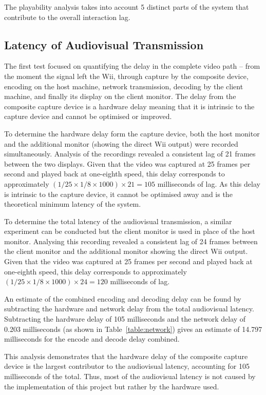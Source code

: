 The playability analysis takes into account 5 distinct parts of the system that
contribute to the overall interaction lag\cite{volkerseekerBestPaper}.

\subsection{Latency of Audiovisual Transmission}
\label{subsec:latency-audiovisual}

The first test focused on quantifying the delay in the complete video path -- from
the moment the signal left the Wii, through capture by the composite device,
encoding on the host machine, network transmission, decoding by the client
machine, and finally its display on the client monitor. The delay from the composite
capture device is a hardware delay meaning that it is intrinsic to the
capture device and cannot be optimised or improved.

To determine the hardware delay form the capture device,
both the host monitor and the additional monitor (showing the direct Wii
output) were recorded simultaneously. Analysis of the recordings revealed a
consistent lag of 21 frames between the two displays. Given that the video was
captured at 25 frames per second and played back at one-eighth speed, this delay
corresponds to approximately $(1/25 \times 1/8 \times 1000) \times 21 = 105$ milliseconds of lag. As this delay is intrinsic to the capture device, it cannot be optimised away and is the theoretical minimum latency of the system.

To determine the total latency of the audiovisual transmission, a similar experiment can be conducted but the client monitor is used in place of the host monitor. Analysing this recording revealed a consistent lag of 24 frames between the client monitor and the additional monitor showing the direct Wii output. Given that the video was captured at 25 frames per second and played back at one-eighth speed, this delay corresponds to approximately $(1/25 \times 1/8 \times 1000) \times 24 = 120$ milliseconds of lag.

An estimate of the combined encoding and decoding delay can be found by subtracting the hardware and network delay from the total audiovisual latency. Subtracting the hardware delay of 105 milliseconds and the network delay of 0.203 milliseconds (as shown in Table~\ref{table:network}) gives an
estimate of 14.797 milliseconds for the encode and decode delay combined.

This analysis demonstrates that the hardware delay of the composite capture device is the largest
contributor to the audiovisual latency, accounting for 105 milliseconds of the total. Thus, most of the audiovisual latency is not caused by the implementation of this project but rather by the hardware used.

